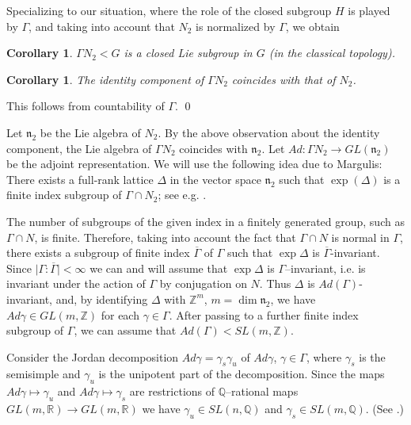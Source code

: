 \documentclass[12pt]{article}
\theoremstyle{boldplain}
\newtheorem{cor}[equation]{Corollary}
\theoremstyle{bolddefinition}
\numberwithin{equation}{section}
\def\Z{{\mathbb Z}}
\def\Ga{\Gamma}
\begin{document}
 Specializing to our situation, where the role of the closed subgroup $H$ is played by $\Ga$, and taking into account that $N_2$ is normalized by $\Ga$,  we obtain 
 
 
\begin{cor}
$\Gamma N_2< G$ is a closed Lie subgroup in $G$ (in the classical topology). 
\end{cor}

 \begin{cor}
 The identity component of $\Gamma N_2$ coincides with that of $N_2$.
 \end{cor}
 \proof This follows from countability of $\Ga$. \qed  
 
 \medskip 
 Let ${\mathfrak n}_2$ be the Lie algebra of $N_2$. By the above observation about the identity 
 component, the Lie algebra of $\Gamma N_2$ coincides with  ${\mathfrak n}_2$.  Let 
 $Ad : \Gamma N_2 \rightarrow GL ({\mathfrak n}_2)$ be the adjoint representation. We will use the following idea due to Margulis: There exists a full-rank  lattice $\Delta$ in the vector space ${\mathfrak n}_2$ such that $\exp (\Delta)$ is a finite index subgroup of  $\Gamma \cap N_2$;  see e.g. \cite[sect. 3.1]{Margulis}. 


 
 The number of subgroups of the given index in a finitely generated group, such as $\Gamma\cap N$, is finite.  
 Therefore, taking into account the fact that $\Ga\cap N$ is normal in $\Ga$, 
 there exists a subgroup  of finite index  $\overline{\Gamma}$ of $\Gamma$ such that $\exp \Delta$ is $\overline{\Gamma}$-invariant. 
 Since  $\mid\Gamma : \overline{\Gamma} \mid < \infty $ we can and will assume that $\exp \Delta$ is $\Gamma$--invariant, i.e. is invariant under the action of $\Ga$ by conjugation on $N$. 
 Thus $\Delta$ is $Ad(\Gamma)$-invariant, and, by identifying $\Delta$ with $\Z^m$, $m = \dim {\mathfrak n}_2$,  we have $Ad \gamma \in  GL (m, \mathbb{Z})$ for 
 each $ \gamma \in \Gamma$.    After passing to a further finite index subgroup of 
 $\Gamma$, we can assume that $Ad (\Ga) <  SL (m, \mathbb{Z})$.
 
  
 Consider the Jordan decomposition $Ad \gamma = \gamma_s \gamma_u$  of  
 $Ad \gamma$,  $\gamma \in \Gamma$, where  $ \gamma_s$ is the semisimple and $ \gamma_u$ 
 is the unipotent part of the decomposition. Since the maps $Ad \gamma \mapsto \gamma_u$ and   
 $Ad \gamma \mapsto \gamma_s$  are restrictions of  ${\mathbb Q}$--rational maps 
 $GL(m, {\mathbb R})\to GL(m, {\mathbb R})$ we have  $ \gamma_u \in  SL (n , \mathbb{Q})$ and $ \gamma_s \in  SL (m , \mathbb{Q})$.  (See \cite[p. 158]{AM}.) 
 
\end{document}
